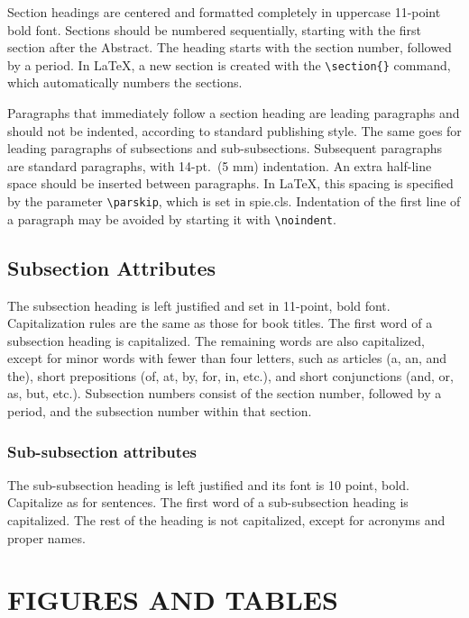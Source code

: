 \documentclass[nocompress]{spie}  %
\begin{document}
Section headings are centered and formatted completely in uppercase 11-point bold font.  Sections should be numbered sequentially, starting with the first section after the Abstract.  The heading starts with the section number, followed by a period.  In LaTeX, a new section is created with the \verb|\section{}| command, which automatically numbers the sections.

Paragraphs that immediately follow a section heading are leading paragraphs and should not be indented, according to standard publishing style\cite{Lamport94}.  The same goes for leading paragraphs of subsections and sub-subsections.  Subsequent paragraphs are standard paragraphs, with 14-pt.\ (5 mm) indentation.  An extra half-line space should be inserted between paragraphs.  In LaTeX, this spacing is specified by the parameter \verb|\parskip|, which is set in {\ttfamily spie.cls}.  Indentation of the first line of a paragraph may be avoided by starting it with \verb|\noindent|.
 
\subsection{Subsection Attributes}

The subsection heading is left justified and set in 11-point, bold font.  Capitalization rules are the same as those for book titles.  The first word of a subsection heading is capitalized.  The remaining words are also capitalized, except for minor words with fewer than four letters, such as articles (a, an, and the), short prepositions (of, at, by, for, in, etc.), and short conjunctions (and, or, as, but, etc.).  Subsection numbers consist of the section number, followed by a period, and the subsection number within that section.  

\subsubsection{Sub-subsection attributes}
The sub-subsection heading is left justified and its font is 10 point, bold.  Capitalize as for sentences.  The first word of a sub-subsection heading is capitalized.  The rest of the heading is not capitalized, except for acronyms and proper names.  

\section{FIGURES AND TABLES}
\end{document}
